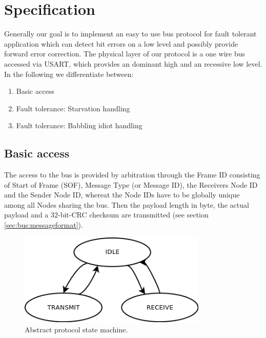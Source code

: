 \section{Specification}
\label{sec:bus:specification}
Generally our goal is to implement an easy to use bus protocol for fault tolerant application which can 
detect bit errors on a low level and possibly provide forward error correction.
The physical layer of our protocol is a one wire bus accessed via USART, which provides an dominant 
high and an recessive low level.
In the following we differentiate between: 
\begin{enumerate}
 \item Basic access
 \item Fault tolerance: Starvation handling
 \item Fault tolerance: Babbling idiot handling
\end{enumerate}

\subsection{Basic access}
\label{sec:bus:basicaccess}
The access to the bus is provided by arbitration through the Frame ID consisting of Start of Frame (SOF), 
Message Type (or Message ID), the Receivers Node ID and the Sender Node ID, whereat the Node IDs have to 
be globally unique among all Nodes sharing the bus.
Then the payload length in byte, the actual payload and a 32-bit-CRC checksum are transmitted (see section \ref{sec:bus:messageformat}).\\

\begin{figure}[h]
\centering
\includegraphics[width=0.8\textwidth]{../images/abstract_statemachine.png}
\caption{Abstract protocol state machine.}
\label{fig:bus:basicaccess:abstractstatemachine}
\end{figure}

